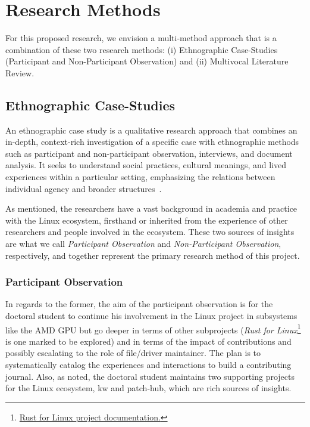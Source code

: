 \section{Research Methods}
\label{chp:research-methods}

For this proposed research, we envision a multi-method approach that is a combination of these two research methods: (i) Ethnographic Case-Studies (Participant and Non-Participant Observation) and (ii) Multivocal Literature Review.

\subsection{Ethnographic Case-Studies}

An ethnographic case study is a qualitative research approach that combines an in-depth, context-rich investigation of a specific case with ethnographic methods such as participant and non-participant observation, interviews, and document analysis. It seeks to understand social practices, cultural meanings, and lived experiences within a particular setting, emphasizing the relations between individual agency and broader structures~\cite{edmonds2017-research-design}.

As mentioned, the researchers have a vast background in academia and practice with the Linux ecosystem, firsthand or inherited from the experience of other researchers and people involved in the ecosystem. These two sources of insights are what we call \textit{Participant Observation} and \textit{Non-Participant Observation}, respectively, and together represent the primary research method of this project.

\subsubsection{Participant Observation}

In regards to the former, the aim of the participant observation is for the doctoral student to continue his involvement in the Linux project in subsystems like the AMD GPU but go deeper in terms of other subprojects (\textit{Rust for Linux}\footnote{\href{https://rust-for-linux.com/}{Rust for Linux project documentation.}} is one marked to be explored) and in terms of the impact of contributions and possibly escalating to the role of file/driver maintainer. The plan is to systematically catalog the experiences and interactions to build a contributing journal. Also, as noted, the doctoral student maintains two supporting projects for the Linux ecosystem, kw and patch-hub, which are rich sources of insights.


